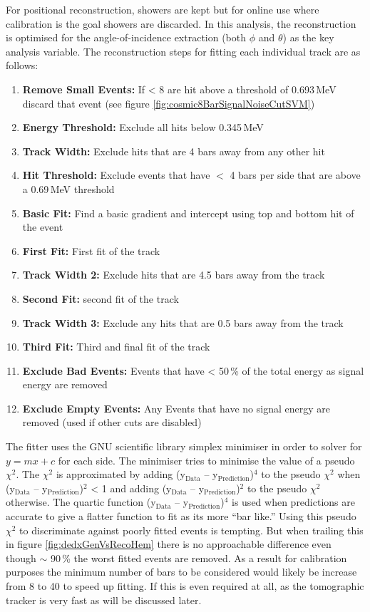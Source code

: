 \clearpage
For positional reconstruction, showers are kept but for online use where calibration is the goal showers are discarded. In this analysis, the reconstruction is optimised for the angle-of-incidence extraction (both $\phi$ and $\theta$) as the key analysis variable. The reconstruction steps for fitting each individual track are as follows: 
\begin{enumerate}
  \item \textbf{Remove Small Events:} If < 8 are hit above a threshold of 0.693\,MeV discard that event (see figure \ref{fig:cosmic8BarSignalNoiseCutSVM})
  \item \textbf{Energy Threshold:} Exclude all hits below 0.345\,MeV
  \item \textbf{Track Width:} Exclude hits that are 4 bars away from any other hit 
  \item \textbf{Hit Threshold:} Exclude events that have $<$ 4 bars per side that are above a 0.69\,MeV threshold
  \item \textbf{Basic Fit:} Find a basic gradient and intercept using top and bottom hit of the event
  \item \textbf{First Fit:} First fit of the track 
  \item \textbf{Track Width 2:} Exclude hits that are 4.5 bars away from the track
  \item \textbf{Second Fit:} second fit of the track
  \item \textbf{Track Width 3:} Exclude any hits that are 0.5 bars away from the track
  \item \textbf{Third Fit:} Third and final fit of the track
  \item \textbf{Exclude Bad Events:} Events that have < 50\,\% of the total energy as signal energy are removed
  \item \textbf{Exclude Empty Events:} Any Events that have no signal energy are removed (used if other cuts are disabled) 
\end{enumerate}
The fitter uses the GNU scientific library simplex minimiser \cite{galassi2002gnu} in order to solver for $y = mx + c$ for each side. The minimiser tries to minimise the value of a pseudo $\chi^2$. The $\chi^2$ is approximated by adding (y$_\textrm{{Data}}$ -- y$_\textrm{{Prediction}}$)$^4$ to the pseudo $\chi^2$ when (y$_\textrm{{Data}}$ -- y$_\textrm{{Prediction}}$)$^2$ < 1 and adding (y$_\textrm{{Data}}$ -- y$_\textrm{{Prediction}}$)$^2$ to the pseudo $\chi^2$ otherwise. The quartic function (y$_\textrm{{Data}}$ -- y$_\textrm{{Prediction}}$)$^4$ is used when predictions are accurate to give a flatter function to fit as its more ``bar like.'' Using this pseudo $\chi^2$ to discriminate against poorly fitted events is tempting. But when trailing this in figure \ref{fig:dedxGenVsRecoHem} there is no approachable difference even though $\sim$ 90\,\% the worst fitted events are removed. As a result for calibration purposes the minimum number of bars to be considered would likely be increase from 8 to 40 to speed up fitting. If this is even required at all, as the tomographic tracker is very fast as will be discussed later. 
